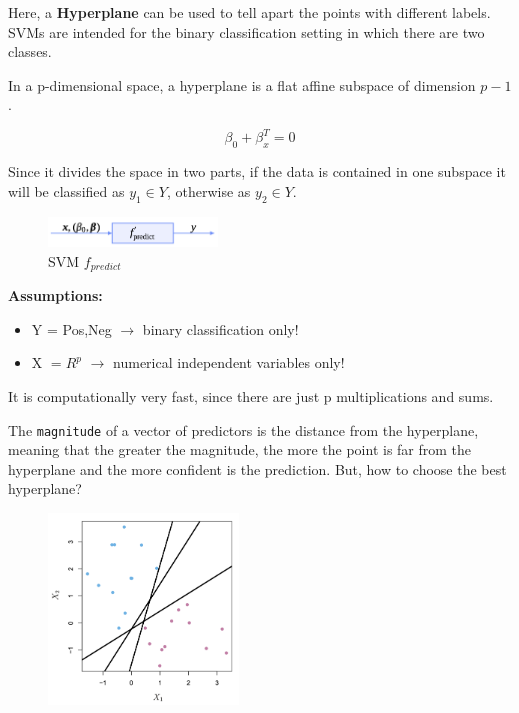 \vspace{-1em}

Here, a \textbf{Hyperplane} can be used to tell apart the points with different labels. SVMs are intended for the binary classification setting in which there are two classes.

\begin{definitionblock}[Hyperplane]
    In a p-dimensional space, a hyperplane is a flat affine subspace of dimension $p-1$. 
    
    $$\beta_0 + \beta^T_x = 0$$

    Since it divides the space in two parts, if the data is contained in one subspace it will be classified as $y_1 \in Y$, otherwise as $y_2 \in Y$.
\end{definitionblock}

\begin{figure}[H]
    \centering
    \includegraphics[width=0.4\textwidth]{assets/fig26.png}
    \caption{SVM $f_{predict}$}
\end{figure}

\textbf{Assumptions:}
\begin{itemize}
    \item Y = Pos,Neg $\to$ binary classification only!
    \item X $= R^{p}$ $\to$ numerical independent variables only!
\end{itemize}

It is computationally very fast, since there are just p multiplications and sums.

The \texttt{magnitude} of a vector of predictors is the distance from the hyperplane, meaning that the greater the magnitude, the more the point is far from the hyperplane and the more confident is the prediction.
But, how to choose the best hyperplane?

\begin{figure}[H]
    \centering
    \includegraphics[width=0.45\textwidth]{assets/fig27.png}
\end{figure}

